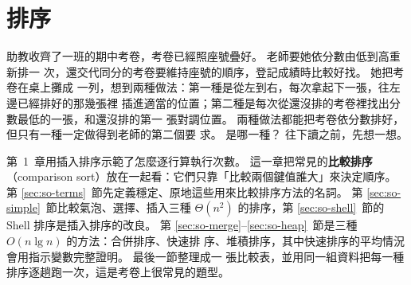\chapter{排序}
\label{ch:sorting}

\newcommand{\sofin}[1]{\textcolor{black!45}{#1}}
\newcommand{\soheap}[4]{%
    \foreach \sov/\sos [count=\soi] in {#3} {%
        \pgfmathtruncatemacro{\solev}{floor(ln(\soi)/ln(2) + 0.0001)}%
        \pgfmathsetmacro{\sox}{(\soi - 2^\solev + 0.5) * #2 / 2^\solev - #2 / 2}%
        \node[so\sos] (#4\soi) at ($(#1) + (\sox, -0.95*\solev)$) {\sov};%
        \ifnum\soi>1
            \pgfmathtruncatemacro{\sop}{floor(\soi/2)}%
            \draw[soedge\sos] (#4\sop) -- (#4\soi);%
        \fi
    }%
}

助教收齊了一班的期中考卷，考卷已經照座號疊好。 老師要她依分數由低到高重新排一
次，還交代同分的考卷要維持座號的順序，登記成績時比較好找。 她把考卷在桌上攤成
一列，想到兩種做法：第一種是從左到右，每次拿起下一張，往左邊已經排好的那幾張裡
插進適當的位置；第二種是每次從還沒排的考卷裡找出分數最低的一張，和還沒排的第一
張對調位置。 兩種做法都能把考卷依分數排好，但只有一種一定做得到老師的第二個要
求。 是哪一種？ 往下讀之前，先想一想。

第~1~章用插入排序示範了怎麼逐行算執行次數。 這一章把常見的\textbf{比較排序}
（comparison sort）放在一起看：它們只靠「比較兩個鍵值誰大」來決定順序。 第
\ref{sec:so-terms}~節先定義穩定、原地這些用來比較排序方法的名詞。 第
\ref{sec:so-simple}~節比較氣泡、選擇、插入三種 $\Theta(n^2)$ 的排序，第
\ref{sec:so-shell}~節的 Shell 排序是插入排序的改良。 第
\ref{sec:so-merge}--\ref{sec:so-heap}~節是三種 $O(n \lg n)$ 的方法：合併排序、快速排
序、堆積排序，其中快速排序的平均情況會用指示變數完整證明。 最後一節整理成一
張比較表，並用同一組資料把每一種排序逐趟跑一次，這是考卷上很常見的題型。

